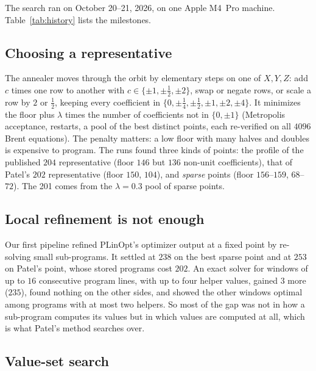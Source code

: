 \documentclass[11pt]{article}
\theoremstyle{remark}
\begin{document}
The search ran on October 20--21, 2026, on one Apple M4~Pro machine.
Table~\ref{tab:history} lists the milestones.

\subsection{Choosing a representative}

The annealer moves through the orbit by elementary steps on one of
$X,Y,Z$: add $c$ times one row to another with $c\in\{\pm1,\pm\frac12,
\pm2\}$, swap or negate rows, or scale a row by $2$ or $\frac12$, keeping
every coefficient in $\{0,\pm\frac14,\pm\frac12,\pm1,\pm2,\pm4\}$.  It
minimizes the floor plus $\lambda$ times the number of coefficients not in
$\{0,\pm1\}$ (Metropolis acceptance, restarts, a pool of the best
distinct points, each re-verified on all $4096$ Brent equations).  The
penalty matters: a low floor with many halves and doubles is expensive
to program.  The runs found three kinds of points: the profile of the
published $204$ representative (floor $146$ but $136$ non-unit
coefficients), that of Patel's $202$ representative (floor $150$, $104$),
and \emph{sparse} points (floor $156$--$159$, $68$--$72$).  The 201 comes
from the $\lambda=0.3$ pool of sparse points.

\subsection{Local refinement is not enough}

Our first pipeline refined PLinOpt's optimizer output at a fixed point
by re-solving small sub-programs.  It settled at $238$ on the best
sparse point and at $253$ on Patel's point, whose stored programs cost
$202$.  An exact solver for windows of up to $16$ consecutive program
lines, with up to four helper values, gained $3$ more ($235$), found
nothing on the other sides, and showed the other windows optimal among
programs with at most two helpers.  So most of the gap was not in how
a sub-program computes its values but in which values are computed at
all, which is what Patel's method searches over.

\subsection{Value-set search}
\end{document}
